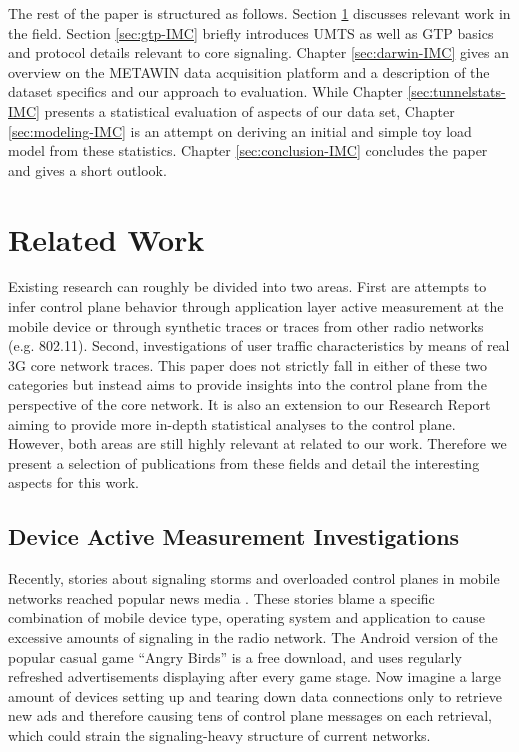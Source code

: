 The rest of the paper is structured as follows. Section \ref{sec:relwork-IMC} discusses relevant work in the field. Section \ref{sec:gtp-IMC} briefly introduces \ac{UMTS} as well as \ac{GTP} basics and protocol details relevant to core signaling. Chapter \ref{sec:darwin-IMC} gives an overview on the \acs{METAWIN} data acquisition platform and a description of the dataset specifics and our approach to evaluation. While Chapter \ref{sec:tunnelstats-IMC} presents a statistical evaluation of aspects of our data set, Chapter \ref{sec:modeling-IMC} is an attempt on deriving an initial and simple toy load model from these statistics. Chapter \ref{sec:conclusion-IMC} concludes the paper and gives a short outlook.

\section{Related Work}
\label{sec:relwork-IMC}

Existing research can roughly be divided into two areas. First are attempts to infer control plane behavior through application layer active measurement at the mobile device or through synthetic traces or traces from other radio networks (e.g. 802.11).
Second, investigations of user traffic characteristics by means of real 3G core network traces.
This paper does not strictly fall in either of these two categories but instead aims to provide insights into the control plane from the perspective of the core network. It is also an extension to our Research Report\cite{metzger2012research} aiming to provide more in-depth statistical analyses to the control plane.  
However, both areas are still highly relevant at related to our work. Therefore we present a selection of publications from these fields and detail the interesting aspects for this work.


\subsection{Device Active Measurement Investigations}

Recently, stories about signaling storms and overloaded control planes in mobile networks reached popular news media \cite{it2011birdandroid, lt2012docostorm}. These stories blame a specific combination of mobile device type, operating system and application to cause excessive amounts of signaling in the radio network. The Android version of the popular casual game ``Angry Birds'' is a free download, and uses regularly refreshed advertisements displaying after every game stage. Now imagine a large amount of devices setting up and tearing down data connections only to retrieve new ads and therefore causing tens of control plane messages on each retrieval, which could strain the signaling-heavy structure of current networks. 

